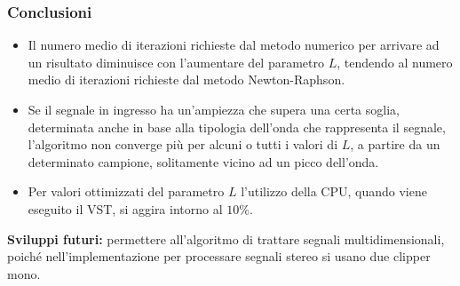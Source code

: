 \documentclass[11pt, t, aspectratio=169]{beamer}
\begin{document}
	\begin{frame}
		\frametitle{Conclusioni}
		
		\begin{itemize}
			\item Il numero medio di iterazioni richieste dal metodo numerico per arrivare ad un risultato diminuisce con l'aumentare del parametro $L$, tendendo al numero medio di iterazioni richieste dal metodo Newton-Raphson.
			\item Se il segnale in ingresso ha un'ampiezza che supera una certa soglia, determinata anche in base alla tipologia dell'onda che rappresenta il segnale, l'algoritmo non converge più per alcuni o tutti i valori di $L$, a partire da un determinato campione, solitamente vicino ad un picco dell'onda.
			\item Per valori ottimizzati del parametro $L$ l'utilizzo della CPU, quando viene eseguito il VST, si aggira intorno al $10\%$.
		\end{itemize}
		
		\vspace{10px}
		\textbf{Sviluppi futuri:} permettere all'algoritmo di trattare segnali multidimensionali, poiché nell'implementazione per processare segnali stereo si usano due clipper mono.
	\end{frame}
\end{document}

